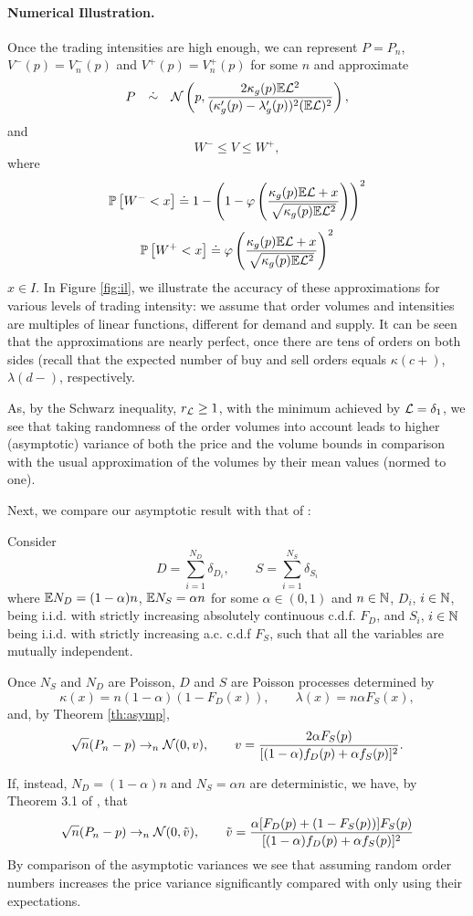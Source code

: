\documentclass{aptpub}
\begin{document}
\paragraph*{Numerical Illustration.}
Once the trading intensities are high enough, we can represent $P=P_n$, $V^-(p)=V_n^-(p)$ and $V^+(p)=V_n^+(p)$ for some $n$ and approximate
$$
P \quad \dot \sim \quad 
\mathcal{N}\left(p,\frac{2\kappa_g(p)\mathbb{E}\mathcal{L}^2}{(\kappa'_g(p)-\lambda'_g(p))^2(\mathbb{E} \mathcal{L})^2} \right ),
$$
and
$$
W^- \leq V \leq W^+,
$$
where
$$
\mathbb{P}\left[ W^-  < x
\right] \doteq 1-\left(1-\varphi\left(\frac{\kappa_g(p)\mathbb{E} \mathcal{L}+x}{\sqrt{\kappa_g(p)\mathbb{E} \mathcal{L}^2}}\right) \right)^2
$$
$$
\mathbb{P}\left[ W^+ < x
\right] \doteq \varphi\left(\frac{\kappa_g(p)\mathbb{E} \mathcal{L}+x}{\sqrt{\kappa_g(p)\mathbb{E} \mathcal{L}^2}}\right)^2
$$
$x \in I$. In Figure \ref{fig:il}, we illustrate the accuracy of these approximations for various levels of trading intensity: we assume that order volumes and intensities are multiples of linear functions, different for demand and supply. It can be seen that the approximations are nearly perfect, once there are tens of orders on both sides (recall that the expected number of buy and sell orders equals $\kappa(c+)$, $\lambda(d-)$, respectively.

\begin{remark} As, by the Schwarz inequality, $r_{\mathcal{L}} \geq 1$, with the minimum achieved by $\mathcal{L} = \delta_1$, we see that taking randomness of the order volumes into account leads to higher (asymptotic) variance of both the price and the volume bounds in comparison with the usual approximation of the volumes by their mean values (normed to one). 
\end{remark}

Next, we compare our asymptotic result with that of \cite{derksen2020clearing}:

\begin{remark} Consider
$$
D=\sum_{i=1}^{N_D} \delta_{D_i}, \qquad S=\sum_{i=1}^{N_S} \delta_{S_i}
$$
where $\mathbb{E} N_D=(1-\alpha)n$, $\mathbb{E} N_S=\alpha n$ for some $\alpha \in (0,1)$ and $n\in \mathbb{N}$,  $D_i$, $i\in\mathbb{N}$, being i.i.d. with strictly increasing absolutely continuous c.d.f. $F_D$, and $S_i$, $i\in \mathbb{N}$ being i.i.d. with strictly increasing a.c. c.d.f $F_S$, such that all the variables are mutually independent.

Once $N_S$ and $N_D$ are Poisson, $D$ and $S$ are Poisson processes determined by 
$$
\kappa(x)=n (1-\alpha) (1-F_D(x)), \qquad \lambda(x)=n \alpha F_S(x),
$$
and, by Theorem \ref{th:asymp},
$$
\sqrt{n}(P_n-p) \rightarrow_n \mathcal{N}(0,v), 
\qquad 
v=\frac{ 2 \alpha F_S(p) }{[(1-\alpha)f_D(p)+\alpha f_S(p)]^2}.
$$
 

If, instead, $N_D=(1-\alpha) n$ and $N_S = \alpha n$ are deterministic, we have, by Theorem 3.1 of \cite{derksen2020clearing}, that 
$$
\sqrt{n}(P_n-p) \rightarrow_n \mathcal{N}(0,\tilde v), 
\qquad 
\tilde v=\frac{ \alpha [F_D(p)+ (1-F_S(p))]F_S(p)}{[(1-\alpha)f_D(p)+\alpha f_S(p)]^2}
$$
By comparison of the asymptotic variances we see that assuming random order numbers increases the price variance significantly compared with only using their expectations. 
\end{remark}
\end{document}
